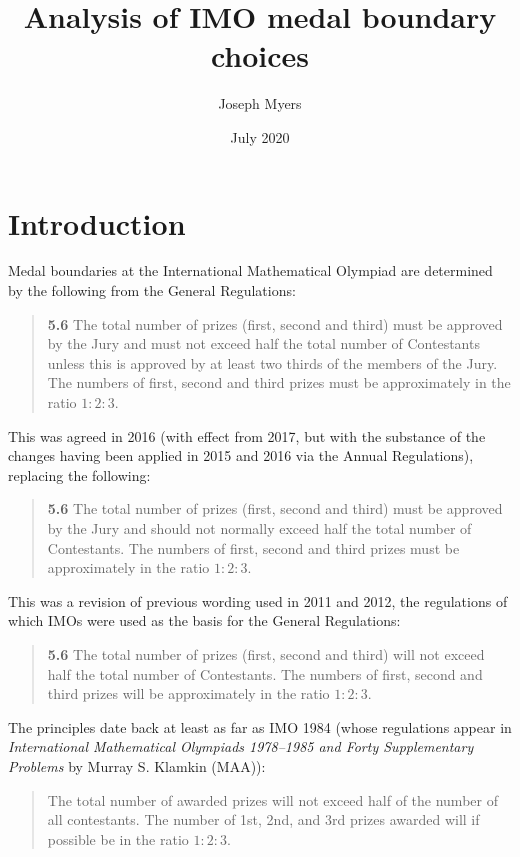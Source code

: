 \documentclass[a4paper,11pt]{article}
\begin{document}
\title{Analysis of IMO medal boundary choices}
\author{Joseph Myers}
\date{July 2020}
\maketitle

\section*{Introduction}

Medal boundaries at the International Mathematical Olympiad are
determined by the following from the General Regulations:

\begin{quote}
\textbf{5.6} The total number of prizes (first, second and third) must
be approved by the Jury and must not exceed half the total number of
Contestants unless this is approved by at least two thirds of the
members of the Jury. The numbers of first, second and third prizes
must be approximately in the ratio $1:2:3$.
\end{quote}

This was agreed in 2016 (with effect from 2017, but with the substance
of the changes having been applied in 2015 and 2016 via the Annual
Regulations), replacing the following:

\begin{quote}
\textbf{5.6} The total number of prizes (first, second and third) must
be approved by the Jury and should not normally exceed half the total
number of Contestants. The numbers of first, second and third prizes
must be approximately in the ratio $1:2:3$.
\end{quote}

This was a revision of previous wording used in 2011 and 2012, the
regulations of which IMOs were used as the basis for the General
Regulations:

\begin{quote}
\textbf{5.6} The total number of prizes (first, second and third) will
not exceed half the total number of Contestants. The numbers of first,
second and third prizes will be approximately in the ratio $1:2:3$.
\end{quote}

The principles date back at least as far as IMO 1984 (whose
regulations appear in \textit{International Mathematical Olympiads
  1978--1985 and Forty Supplementary Problems} by Murray S. Klamkin
(MAA)):

\begin{quote}
The total number of awarded prizes will not exceed half of the number
of all contestants.  The number of 1st, 2nd, and 3rd prizes awarded
will if possible be in the ratio $1:2:3$.
\end{quote}
\end{document}
